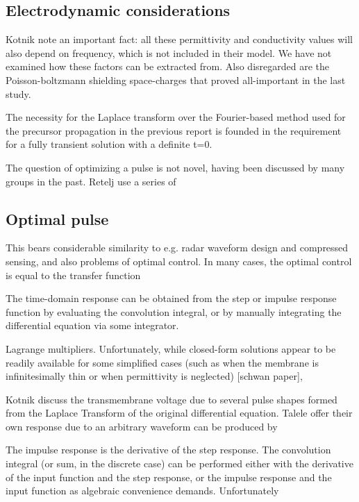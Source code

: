\documentclass[fleqn,10pt]{paper}
\begin{document}

\subsection{Electrodynamic considerations}

Kotnik note an important fact: all these permittivity and conductivity values will also depend on frequency, which is not included in their model. We have not examined how these factors can be extracted from. Also disregarded are the Poisson-boltzmann shielding space-charges that proved all-important in the last study. 

The necessity for the Laplace transform over the Fourier-based method used for the precursor propagation in the previous report is founded in the requirement for a fully transient solution with a definite t=0.

The question of optimizing a pulse is not novel, having been discussed by many groups in the past. Retelj use a series of 

\subsection{Optimal pulse}

This bears considerable similarity to e.g. radar waveform design and compressed sensing, and also problems of optimal control. In many cases, the optimal control is equal to the transfer function

The time-domain response can be obtained from the step or impulse response function by evaluating the convolution integral, or by manually integrating the differential equation via some integrator.

Lagrange multipliers. Unfortunately, while closed-form solutions appear to be readily available for some simplified cases (such as when the membrane is infinitesimally thin or when permittivity is neglected) [schwan paper], 

Kotnik discuss the transmembrane voltage due to several pulse shapes formed from the Laplace Transform of the original differential equation. Talele offer their own response due to an arbitrary waveform can be produced by 

The impulse response is the derivative of the step response. The convolution integral (or sum, in the discrete case) can be performed either with the derivative of the input function and the step response, or the impulse response and the input function as algebraic convenience demands. Unfortunately
\end{document}
